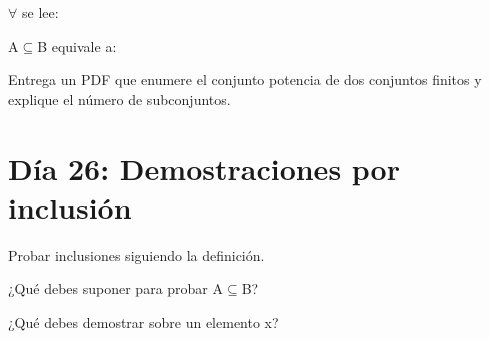 \begin{activity}[id=dia-25-opcion-01,type=choice,weight=1]

\(\forall\) se lee:





\end{activity}

\begin{activity}[id=dia-25-opcion-02,type=choice,weight=1]

A\(\subseteq\)B equivale a:





\end{activity}

\begin{deliverable}[id=entrega-dia-25,type=upload,weight=3]

Entrega un PDF que enumere el conjunto potencia de dos conjuntos finitos y explique el número de subconjuntos.

\end{deliverable}

\section{Día 26: Demostraciones por inclusión}

\begin{lesson}[id=dia-26-lectura,weight=0]

Probar inclusiones siguiendo la definición.

\end{lesson}

\begin{activity}[id=dia-26-corta-01,type=short,weight=1]

¿Qué debes suponer para probar A\(\subseteq\)B?

\end{activity}

\begin{activity}[id=dia-26-corta-02,type=short,weight=1]

¿Qué debes demostrar sobre un elemento x?

\end{activity}

